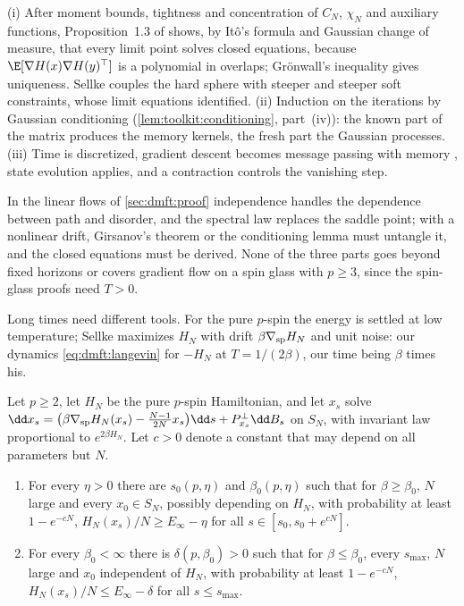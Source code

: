 \begin{refsection}
\begin{proofsketch}
(i) After moment bounds, tightness and concentration of $C_N$, $\chi_N$ and auxiliary functions, Proposition~1.3 of \textcite{BenArousDemboGuionnet2006} shows, by Itô's formula and Gaussian change of measure, that every limit point solves closed equations, because $\E[\nabla H(x)\nabla H(y)^\top]$ is a polynomial in overlaps; Grönwall's inequality gives uniqueness. Sellke couples the hard sphere with steeper and steeper soft constraints, whose limit equations \textcite{DemboGuionnetMazza2007} identified. (ii) Induction on the iterations by Gaussian conditioning (\cref{lem:toolkit:conditioning}, part~(iv)): the known part of the matrix produces the memory kernels, the fresh part the Gaussian processes. (iii) Time is discretized, gradient descent becomes message passing with memory \parencite{CelentanoMontanariWu2020}, state evolution applies, and a contraction controls the vanishing step.
\end{proofsketch}

In the linear flows of \cref{sec:dmft:proof} independence handles the dependence between path and disorder, and the spectral law replaces the saddle point; with a nonlinear drift, Girsanov's theorem or the conditioning lemma must untangle it, and the closed equations must be derived. None of the three parts goes beyond fixed horizons or covers gradient flow on a spin glass with $p\ge3$, since the spin-glass proofs need $T>0$.

Long times need different tools. For the pure $p$-spin the energy is settled at low temperature; Sellke maximizes $H_N$ with drift $\beta\nabla_{\mathrm{sp}}H_N$ and unit noise: our dynamics \eqref{eq:dmft:langevin} for $-H_N$ at $T=1/(2\beta)$, our time being $\beta$ times his.

\begin{theorem}\label{thm:dmft:sellke}
Let $p\ge2$, let $H_N$ be the pure $p$-spin Hamiltonian, and let $x_s$ solve $\dd x_s=\bigl(\beta\nabla_{\dmftsp}H_N(x_s)-\frac{N-1}{2N}x_s\bigr)\dd s+P^\perp_{x_s}\dd B_s$ on $S_N$, with invariant law proportional to $e^{2\beta H_N}$. Let $c>0$ denote a constant that may depend on all parameters but $N$.
\begin{enumerate}
\item For every $\eta>0$ there are $s_0(p,\eta)$ and $\beta_0(p,\eta)$ such that for $\beta\ge\beta_0$, $N$ large and every $x_0\in S_N$, possibly depending on $H_N$, with probability at least $1-e^{-cN}$, $H_N(x_s)/N\ge E_\infty-\eta$ for all $s\in[s_0,s_0+e^{cN}]$.
\item For every $\beta_0<\infty$ there is $\delta(p,\beta_0)>0$ such that for $\beta\le\beta_0$, every $s_{\max}$, $N$ large and $x_0$ independent of $H_N$, with probability at least $1-e^{-cN}$, $H_N(x_s)/N\le E_\infty-\delta$ for all $s\le s_{\max}$.
\end{enumerate}
\end{theorem}


\end{refsection}
